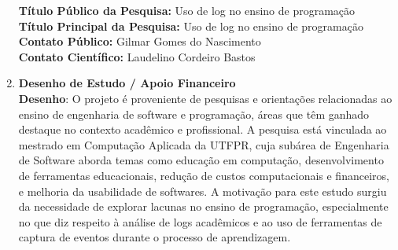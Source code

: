 \documentclass[10pt,a4paper]{article}
\begin{document}
\begin{enumerate}
\textbf{Título Público da Pesquisa:} Uso de log no ensino de programação\\
\textbf{Título Principal da Pesquisa:} Uso de log no ensino de programação \\
\textbf{Contato Público:} Gilmar Gomes do Nascimento\\
\textbf{Contato Científico:} Laudelino Cordeiro Bastos
\item \textbf{Desenho de Estudo / Apoio Financeiro}\\
\noindent \textbf{Desenho}: 
O projeto é proveniente de pesquisas e orientações relacionadas ao ensino de engenharia de software e programação, áreas que têm ganhado destaque no contexto acadêmico e profissional. A pesquisa está vinculada ao mestrado em Computação Aplicada da UTFPR, cuja subárea de Engenharia de Software aborda temas como educação em computação, desenvolvimento de ferramentas educacionais, redução de custos computacionais e financeiros, e melhoria da usabilidade de softwares. A motivação para este estudo surgiu da necessidade de explorar lacunas no ensino de programação, especialmente no que diz respeito à análise de logs acadêmicos e ao uso de ferramentas de captura de eventos durante o processo de aprendizagem.


\end{enumerate}
\end{document}
